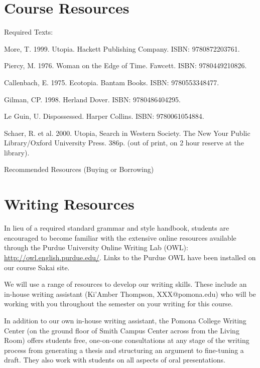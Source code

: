 \section{Course Resources} 

\noindent Required Texts: 
\begin{itemize*}
	\item More, T. 1999. Utopia. Hackett Publishing Company. ISBN: 9780872203761.
	\item Piercy, M. 1976. Woman on the Edge of Time. Fawcett. ISBN: 9780449210826.
  \item Callenbach, E. 1975. Ecotopia. Bantam Books. ISBN: 9780553348477.
  \item Gilman, CP. 1998. Herland Dover. ISBN: 9780486404295.
  \item Le Guin, U.  Dispossessed. Harper Collins. ISBN: 9780061054884.
  \item Schaer, R. et al. 2000. Utopia, Search in Western Society. The New Your Public Library/Oxford University Press. 386p. (out of print, on 2 hour reserve at the library).
\end{itemize*}

\noindent Recommended Resources (Buying or Borrowing)



\section{Writing Resources}

In lieu of a required standard grammar and style handbook, students are encouraged to become familiar with the extensive online resources available through the Purdue University Online Writing Lab (OWL): \url{http://owl.english.purdue.edu/}. Links to the Purdue OWL have been installed on our course Sakai site.

We will use a range of resources to develop our writing skills. These include an in-house writing assistant (Ki'Amber Thompson, XXX@pomona.edu) who will be working with you throughout the semester on your writing for this course.

In addition to our own in-house writing assistant, the Pomona College Writing Center (on the ground floor of Smith Campus Center across from the Living Room) offers students free, one-on-one consultations at any stage of the writing process from generating a thesis and structuring an argument to fine-tuning a draft. They also work with students on all aspects of oral presentations. 

